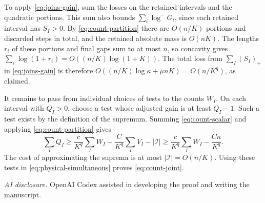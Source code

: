 \documentclass[11pt]{article}
\theoremstyle{definition}
\begin{document}
To apply \eqref{eq:joins-gain}, sum the losses on the retained intervals and the quadratic portions. This sum also bounds $\sum_i\log^-G_i$, since each retained interval has $S_I>0$. By \eqref{eq:count-partition} there are $O(n/K)$ portions and discarded steps in total, and the retained absolute mass is $O(nK)$. The lengths \(r_i\) of these portions and final gaps sum to at most \(n\), so concavity gives $\sum_i\log(1+r_i)=O((n/K)\log(1+K))$. The total loss from $\sum_I(S_I)_+$ in \eqref{eq:joins-gain} is therefore $O((n/K)\log\kappa+\mu nK)=O(n/K^q)$, as claimed.

It remains to pass from individual choices of tests to the counts \(W_I\).
On each interval with \(Q_I>0\), choose a test whose adjusted gain is
at least \(Q_I-1\). Such a test exists by the definition of the supremum.
Summing \eqref{eq:count-scalar} and applying \eqref{eq:count-partition} gives
\[
 \sum_I Q_I\ge \frac{c}{K^q}\sum_I W_I
                 -\frac{C}{K^q}\sum_I V_I-|\mathcal I|
 \ge \frac{c}{K^q}\sum_I W_I-\frac{Cn}{K^q}.
\]
The cost of approximating the suprema is at most
\(|\mathcal I|=O(n/K)\). Using these tests in \eqref{eq:physical-simultaneous}
proves \eqref{eq:count-joint}.
\par\smallskip
\noindent\emph{AI disclosure.} OpenAI Codex assisted in developing the proof and writing the manuscript.
\end{document}
